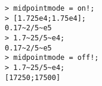 \begin{center}\begin{minipage}{15cm}\begin{Verbatim}[frame=single]
> midpointmode = on!;
> [1.725e4;1.75e4];
0.17~2/5~e5
> 1.7~25/5~e4;
0.17~2/5~e5
> midpointmode = off!;
> 1.7~25/5~e4;
[17250;17500]
\end{Verbatim}
\end{minipage}\end{center}
